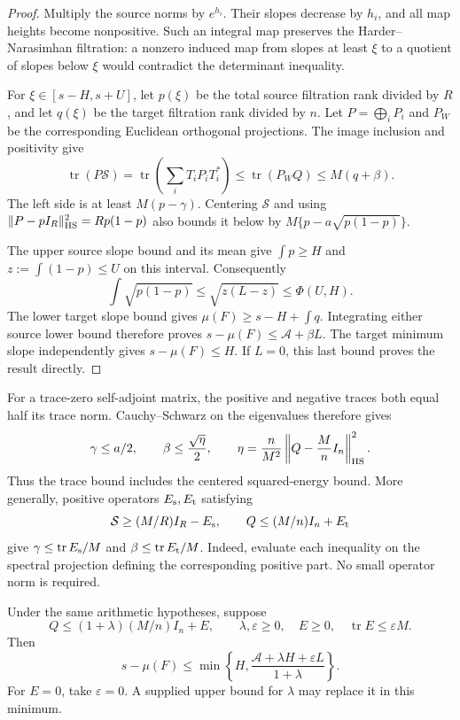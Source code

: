 \begin{proof}
Multiply the source norms by \(e^{h_i}\). Their slopes decrease by
\(h_i\), and all map heights become nonpositive. Such an integral
map preserves the Harder--Narasimhan filtration: a nonzero induced
map from slopes at least \(\xi\) to a quotient of slopes below
\(\xi\) would contradict the determinant inequality.

For \(\xi\in[s-H,s+U]\), let \(p(\xi)\) be the total source
filtration rank divided by \(R\), and let \(q(\xi)\) be the target
filtration rank divided by \(n\). Let \(P=\bigoplus_iP_i\) and \(P_W\)
be the corresponding Euclidean orthogonal projections. The image
inclusion and positivity give
\[
 \operatorname{tr}(P\mathcal S)
 =\operatorname{tr}\left(\sum_iT_iP_iT_i^*\right)
 \le\operatorname{tr}(P_WQ)\le M(q+\beta).
\]
The left side is at least \(M(p-\gamma)\). Centering \(\mathcal S\)
and using \(\|P-pI_R\|_{\rm HS}^2=Rp(1-p)\) also bounds it below by
\(M\{p-a\sqrt{p(1-p)}\}\).

The upper source slope bound and its mean give
\(\int p\ge H\) and \(z:=\int(1-p)\le U\) on this interval.
Consequently
\[
 \int\sqrt{p(1-p)}
 \le\sqrt{z(L-z)}\le\Phi(U,H).
\]
The lower target slope bound gives
\(\mu(F)\ge s-H+\int q\). Integrating either source lower bound
therefore proves \(s-\mu(F)\le\mathcal A+\beta L\).
The target minimum slope independently gives \(s-\mu(F)\le H\).
If \(L=0\), this last bound proves the result directly.
\end{proof}

For a trace-zero self-adjoint matrix, the positive and negative
traces both equal half its trace norm. Cauchy--Schwarz on the
eigenvalues therefore gives
\[
 \gamma\le a/2,\qquad
 \beta\le\frac{\sqrt\eta}{2},\qquad
 \eta=\frac n{M^2}\left\|Q-\frac Mn I_n\right\|_{\rm HS}^2.
\]
Thus the trace bound includes the centered squared-energy bound.
More generally, positive operators \(E_{\rm s},E_{\rm t}\) satisfying
\[
 \mathcal S\ge(M/R)I_R-E_{\rm s},\qquad
 Q\le(M/n)I_n+E_{\rm t}
\]
give \(\gamma\le\operatorname{tr}E_{\rm s}/M\) and
\(\beta\le\operatorname{tr}E_{\rm t}/M\).
Indeed, evaluate each inequality on the spectral projection defining
the corresponding positive part. No small operator norm is required.

\begin{corollary}
\label{shared-trace-bessel}
Under the same arithmetic hypotheses, suppose
\[
 Q\le(1+\lambda)(M/n)I_n+E,\qquad
 \lambda,\varepsilon\ge0,\quad E\ge0,\quad
 \operatorname{tr}E\le\varepsilon M.
\]
Then
\begin{equation}\label{shared-trace-bessel-bound}
 s-\mu(F)\le
 \min\left\{H,\frac{\mathcal A+\lambda H+\varepsilon L}
                         {1+\lambda}\right\}.
\end{equation}
For \(E=0\), take \(\varepsilon=0\). A supplied upper bound for
\(\lambda\) may replace it in this minimum.
\end{corollary}

